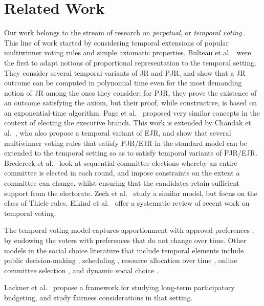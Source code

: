 \section{Related Work}
Our work belongs to the stream of research on \emph{perpetual}, or {\em temporal voting} \cite{lackner2020perpetual,lackner2023proportionalPV,elkind2024temporalelections}.
This line of work started by considering temporal extensions of popular multiwinner voting rules and simple axiomatic properties.
Bulteau et al.~ were the first to adapt notions of proportional representation to the temporal setting. They 
consider several temporal variants of JR and PJR, and 
show that a JR outcome can be computed in polynomial time even for the most
demanding notion of JR among the ones they consider; for PJR, 
they prove the existence of an outcome satisfying the axiom, but their
proof, while constructive, is based on an exponential-time algorithm. Page et al.~ proposed very similar concepts in the context of electing the executive branch. This work is extended by Chandak et al.~, who also propose a temporal variant of EJR, 
and show that several multiwinner voting rules
that satisfy PJR/EJR in the standard model can be extended
to the temporal setting so as to satisfy temporal variants of PJR/EJR.
Bredereck et al.~ look at sequential committee elections whereby 
an entire committee is elected in each round, and impose
constraints on the extent a committee can change, whilst ensuring that the candidates retain sufficient support from the electorate.
Zech et al.~ study a similar model, but focus on the class of Thiele rules.
Elkind et al.~ offer a systematic review of recent work 
on temporal voting.

The temporal voting model captures apportionment with approval preferences \cite{brill2024partyapportionment,delemazure2022spelection}, by endowing the voters with preferences that do not change over time.
Other models in the social choice literature that include temporal elements include
public decision-making \cite{alouf2022better,conitzer2017fairpublic,fain2018publicgoods,skowron2022proppublic,lackner2023freeriding,MPS23a,neoh2025strategicchores}, scheduling \cite{elkind2022temporalslot,patro2022virtualconf}, resource allocation over time \cite{bampis2018fairtime,allouah2023fairallocationtime,elkind2024temporalfairdivision}, online committee selection \cite{do2022onlinecommittee}, and dynamic social choice \cite{parkes2013dynamicsocialchoice,freeman2017dynamicsocialchoice}.

Lackner et al.~ propose a framework for studying long-term participatory budgeting, and study fairness considerations in that setting.